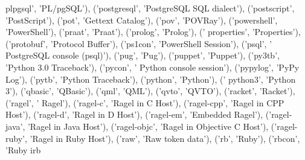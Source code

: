 \begin{DoxyCode}
{      plpgsql'}, \textcolor{stringliteral}{'PL/pgSQL'}), (\textcolor{stringliteral}{'postgresql'}, \textcolor{stringliteral}{'PostgreSQL SQL dialect'}), (\textcolor{stringliteral}{'postscript'}, \textcolor{stringliteral}{'PostScript'}), (\textcolor{stringliteral}{'pot'}, \textcolor{stringliteral}{'Gettext
       Catalog'}), (\textcolor{stringliteral}{'pov'}, \textcolor{stringliteral}{'POVRay'}), (\textcolor{stringliteral}{'powershell'}, \textcolor{stringliteral}{'PowerShell'}), (\textcolor{stringliteral}{'praat'}, \textcolor{stringliteral}{'Praat'}), (\textcolor{stringliteral}{'prolog'}, \textcolor{stringliteral}{'Prolog'}), (\textcolor{stringliteral}{'
      properties'}, \textcolor{stringliteral}{'Properties'}), (\textcolor{stringliteral}{'protobuf'}, \textcolor{stringliteral}{'Protocol Buffer'}), (\textcolor{stringliteral}{'ps1con'}, \textcolor{stringliteral}{'PowerShell Session'}), (\textcolor{stringliteral}{'psql'}, \textcolor{stringliteral}{'
      PostgreSQL console (psql)'}), (\textcolor{stringliteral}{'pug'}, \textcolor{stringliteral}{'Pug'}), (\textcolor{stringliteral}{'puppet'}, \textcolor{stringliteral}{'Puppet'}), (\textcolor{stringliteral}{'py3tb'}, \textcolor{stringliteral}{'Python 3.0 Traceback'}), (\textcolor{stringliteral}{'pycon'}, \textcolor{stringliteral}{'
      Python console session'}), (\textcolor{stringliteral}{'pypylog'}, \textcolor{stringliteral}{'PyPy Log'}), (\textcolor{stringliteral}{'pytb'}, \textcolor{stringliteral}{'Python Traceback'}), (\textcolor{stringliteral}{'python'}, \textcolor{stringliteral}{'Python'}), (\textcolor{stringliteral}{'
      python3'}, \textcolor{stringliteral}{'Python 3'}), (\textcolor{stringliteral}{'qbasic'}, \textcolor{stringliteral}{'QBasic'}), (\textcolor{stringliteral}{'qml'}, \textcolor{stringliteral}{'QML'}), (\textcolor{stringliteral}{'qvto'}, \textcolor{stringliteral}{'QVTO'}), (\textcolor{stringliteral}{'racket'}, \textcolor{stringliteral}{'Racket'}), (\textcolor{stringliteral}{'ragel'}, \textcolor{stringliteral}{'
      Ragel'}), (\textcolor{stringliteral}{'ragel-c'}, \textcolor{stringliteral}{'Ragel in C Host'}), (\textcolor{stringliteral}{'ragel-cpp'}, \textcolor{stringliteral}{'Ragel in CPP Host'}), (\textcolor{stringliteral}{'ragel-d'}, \textcolor{stringliteral}{'Ragel in D Host'}),
       (\textcolor{stringliteral}{'ragel-em'}, \textcolor{stringliteral}{'Embedded Ragel'}), (\textcolor{stringliteral}{'ragel-java'}, \textcolor{stringliteral}{'Ragel in Java Host'}), (\textcolor{stringliteral}{'ragel-objc'}, \textcolor{stringliteral}{'Ragel in Objective C
       Host'}), (\textcolor{stringliteral}{'ragel-ruby'}, \textcolor{stringliteral}{'Ragel in Ruby Host'}), (\textcolor{stringliteral}{'raw'}, \textcolor{stringliteral}{'Raw token data'}), (\textcolor{stringliteral}{'rb'}, \textcolor{stringliteral}{'Ruby'}), (\textcolor{stringliteral}{'rbcon'}, \textcolor{stringliteral}{'Ruby irb
}
\end{DoxyCode}
